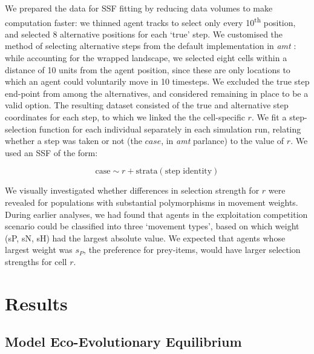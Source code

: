     We prepared the data for SSF fitting by reducing data volumes to make computation faster: we thinned agent tracks to select only every 10\textsuperscript{th} position, and selected 8 alternative positions for each `true' step.
    We customised the method of selecting alternative steps from the default implementation in \textit{amt} \citep{signer2019}: while accounting for the wrapped landscape, we selected eight cells within a distance of 10 units from the agent position, since these are only locations to which an agent could voluntarily move in 10 timesteps.
    We excluded the true step end-point from among the alternatives, and considered remaining in place to be a valid option.
    The resulting dataset consisted of the true and alternative step coordinates for each step, to which we linked the the cell-specific $r$.
    We fit a step-selection function for each individual separately in each simulation run, relating whether a step was taken or not (the $case$, in \textit{amt} parlance) to the value of $r$.
    We used an SSF of the form:
    \begin{linenomath*}
        \begin{equation}
            \text{case} \sim r + \text{strata}(\text{step~identity})
        \end{equation}
    \end{linenomath*}
    We visually investigated whether differences in selection strength for $r$ were revealed for populations with substantial polymorphisms in movement weights.
    During earlier analyses, we had found that agents in the exploitation competition scenario could be classified into three `movement types', based on which weight (sP, sN, sH) had the largest absolute value.
    We expected that agents whose largest weight was $s_P$, the preference for prey-items, would have larger selection strengths for cell $r$.
    
    \section*{Results}
    
    \subsection*{Model Eco-Evolutionary Equilibrium}
    
